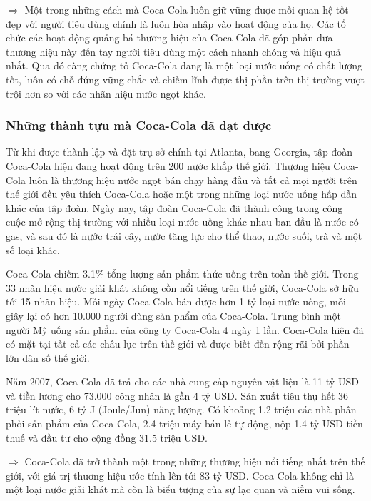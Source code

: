 \documentclass{article}
\begin{document}
    $\Rightarrow$ Một trong những cách mà Coca-Cola luôn giữ vững được mối quan hệ tốt đẹp với người tiêu dùng chính là luôn hòa nhập vào hoạt động của họ. Các tổ chức các hoạt động quảng bá thương hiệu của Coca-Cola đã góp phần đưa thương hiệu này đến tay người tiêu dùng một cách nhanh chóng và hiệu quả nhất. Qua đó càng chứng tỏ Coca-Cola đang là một loại nước uống có chất lượng tốt, luôn có chỗ đứng vững chắc và chiếm lĩnh được thị phần trên thị trường vượt trội hơn so với các nhãn hiệu nước ngọt khác.

    \subsubsection{Những thành tựu mà Coca-Cola đã đạt được}
    \vspace{0.2cm}
    Từ khi được thành lập và đặt trụ sở chính tại Atlanta, bang Georgia, tập đoàn Coca-Cola hiện đang hoạt động trên 200 nước khắp thế giới. Thương hiệu Coca-Cola luôn là thương hiệu nước ngọt bán chạy hàng đầu và tất cả mọi người trên thế giới đều yêu thích Coca-Cola hoặc một trong những loại nước uống hấp dẫn khác của tập đoàn. Ngày nay, tập đoàn Coca-Cola đã thành công trong công cuộc mở rộng thị trường với nhiều loại nước uống khác nhau ban đầu là nước có gas, và sau đó là nước trái cây, nước tăng lực cho thể thao, nước suối, trà và một số loại khác.
    
    \vspace{0.2cm}
    Coca-Cola chiếm 3.1\% tổng lượng sản phẩm thức uống trên toàn thế giới. Trong 33 nhãn hiệu nước giải khát không cồn nổi tiếng trên thế giới, Coca-Cola sở hữu tới 15 nhãn hiệu. Mỗi ngày Coca-Cola bán được hơn 1 tỷ loại nước uống, mỗi giây lại có hơn 10.000 người dùng sản phẩm của Coca-Cola. Trung bình một người Mỹ uống sản phẩm của công ty Coca-Cola 4 ngày 1 lần. Coca-Cola hiện đã có mặt tại tất cả các châu lục trên thế giới và được biết đến rộng rãi bởi phần lớn dân số thế giới.

    \vspace{0.2cm}
    Năm 2007, Coca-Cola đã trả cho các nhà cung cấp nguyên vật liệu là 11 tỷ USD và tiền lương cho 73.000 công nhân là gần 4 tỷ USD. Sản xuất tiêu thụ hết 36 triệu lít nước, 6 tỷ J (Joule/Jun) năng lượng. Có khoảng 1.2 triệu các nhà phân phối sản phẩm của Coca-Cola, 2.4 triệu máy bán lẻ tự động, nộp 1.4 tỷ USD tiền thuế và đầu tư cho cộng đồng 31.5 triệu USD.

    \vspace{0.2cm}
    $\Rightarrow$ Coca-Cola đã trở thành một trong những thương hiệu nổi tiếng nhất trên thế giới, với giá trị thương hiệu ước tính lên tới 83 tỷ USD. Coca-Cola không chỉ là một loại nước giải khát mà còn là biểu tượng của sự lạc quan và niềm vui sống.
\end{document}
